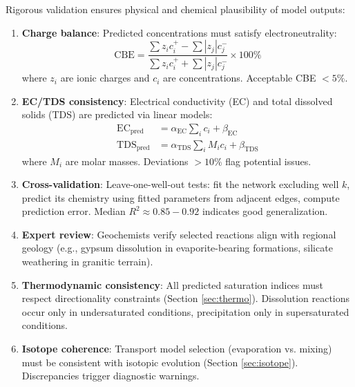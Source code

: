 \documentclass[12pt,a4paper]{article}
\theoremstyle{plain}
\theoremstyle{definition}
\theoremstyle{remark}
\begin{document}
Rigorous validation ensures physical and chemical plausibility of model outputs:

\begin{enumerate}
	\item \textbf{Charge balance}: Predicted concentrations must satisfy electroneutrality:
	      \begin{equation}
		      \text{CBE} = \frac{\sum z_i c_i^+ - \sum |z_j| c_j^-}{\sum z_i c_i^+ + \sum |z_j| c_j^-} \times 100\%
	      \end{equation}
	      where $z_i$ are ionic charges and $c_i$ are concentrations. Acceptable CBE $< 5\%$.

	\item \textbf{EC/TDS consistency}: Electrical conductivity (EC) and total dissolved solids (TDS) are predicted via linear models:
	      \begin{align}
		      \text{EC}_{\text{pred}}  & = \alpha_{\text{EC}} \sum_i c_i + \beta_{\text{EC}}       \\
		      \text{TDS}_{\text{pred}} & = \alpha_{\text{TDS}} \sum_i M_i c_i + \beta_{\text{TDS}}
	      \end{align}
	      where $M_i$ are molar masses. Deviations $>10\%$ flag potential issues.

	\item \textbf{Cross-validation}: Leave-one-well-out tests: fit the network excluding well $k$, predict its chemistry using fitted parameters from adjacent edges, compute prediction error. Median $R^2 \approx 0.85-0.92$ indicates good generalization.

	\item \textbf{Expert review}: Geochemists verify selected reactions align with regional geology (e.g., gypsum dissolution in evaporite-bearing formations, silicate weathering in granitic terrain).

	\item \textbf{Thermodynamic consistency}: All predicted saturation indices must respect directionality constraints (Section \ref{sec:thermo}). Dissolution reactions occur only in undersaturated conditions, precipitation only in supersaturated conditions.

	\item \textbf{Isotope coherence}: Transport model selection (evaporation vs. mixing) must be consistent with isotopic evolution (Section \ref{sec:isotope}). Discrepancies trigger diagnostic warnings.
\end{enumerate}
\end{document}
